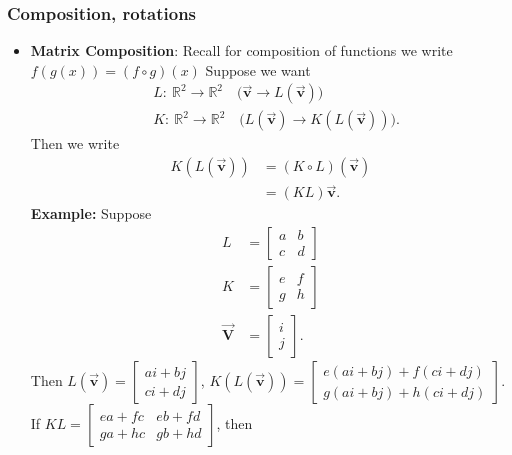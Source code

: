 \documentclass{report}
\begin{document}
    \pagebreak 
    \subsubsection{Composition, rotations}
    \begin{itemize}
                \item \textbf{Matrix Composition}: Recall for composition of functions we write $f(g(x)) = (f\circ g)(x)$
            \bigbreak \noindent 
            Suppose we want
            \begin{align*}
                &L:\ \mathbb{R}^{2} \to \mathbb{R}^{2} \quad \text{($\vec{\mathbf{v}} \to L(\vec{\mathbf{v}})$)} \\
                &K:\ \mathbb{R}^{2} \to \mathbb{R}^{2} \quad \text{($L(\vec{\mathbf{v}}) \to K(L(\vec{\mathbf{v}}))$)}
            .\end{align*}
            Then we write 
            \begin{align*}
                K(L(\vec{\mathbf{v}}))  &= (K \circ L)(\vec{\mathbf{v}}) \\
                                        &= (KL)\vec{\mathbf{v}}
            .\end{align*}
            \bigbreak \noindent 
            \textbf{Example:} Suppose
            \begin{align*}
                L &= \begin{bmatrix} a & b \\ c& d\end{bmatrix} \\
                K &= \begin{bmatrix} e & f \\ g& h\end{bmatrix} \\
                \vec{\mathbf{V}} &= \begin{bmatrix} i \\ j \end{bmatrix}
            .\end{align*}
            \bigbreak \noindent 
            Then $L(\vec{\mathbf{v}}) = \begin{bmatrix} ai + bj \\ ci + dj\end{bmatrix} $, $K(L(\vec{\mathbf{v}})) = \begin{bmatrix} e(ai + bj) + f(ci + dj) \\ g(ai + bj)  + h (ci + dj) \end{bmatrix}$. If $KL = \begin{bmatrix} ea + fc & eb + fd \\ ga + hc  & gb + hd \end{bmatrix}$, then

\end{itemize}
\end{document}
